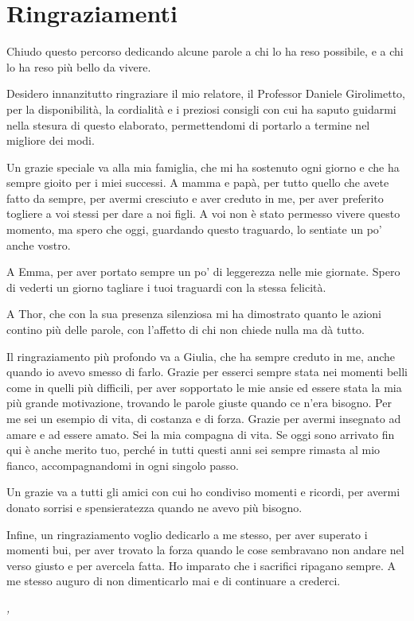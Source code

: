 \clearpage
{}
{}

\pagestyle{empty}

\chapter*{Ringraziamenti}
\thispagestyle{empty}
\begingroup
\setlength{\parskip}{0.6\baselineskip}
\setlength{\parindent}{0pt}

Chiudo questo percorso dedicando alcune parole a chi lo ha reso possibile, e a chi lo ha reso più bello da vivere.

Desidero innanzitutto ringraziare il mio relatore, il Professor Daniele Girolimetto, per la disponibilità, la cordialità e i preziosi 
consigli con cui ha saputo guidarmi nella stesura di questo elaborato, permettendomi di portarlo a termine nel migliore dei modi.

Un grazie speciale va alla mia famiglia, che mi ha sostenuto ogni giorno e che ha sempre gioito per i miei successi. A mamma e papà, per tutto quello che avete fatto da sempre, per avermi cresciuto e aver creduto in me, per aver preferito togliere a voi stessi per dare a noi figli. A voi 
non è stato permesso vivere questo momento, ma spero che oggi, guardando questo traguardo, lo sentiate un po' anche vostro.

A Emma, per aver portato sempre un po' di leggerezza nelle mie giornate. Spero di vederti un giorno tagliare i tuoi traguardi 
con la stessa felicità. 

A Thor, che con la sua presenza silenziosa mi ha dimostrato quanto le azioni contino più delle parole, con l'affetto di chi non chiede nulla ma dà tutto.

Il ringraziamento più profondo va a Giulia, che ha sempre creduto in me, anche quando io avevo smesso di farlo. Grazie per esserci sempre 
stata nei momenti belli come in quelli più difficili, per aver sopportato le mie ansie ed essere stata la mia più grande motivazione, 
trovando le parole giuste quando ce n'era bisogno. Per me sei un esempio di vita, di costanza e di forza. Grazie per avermi insegnato ad 
amare e ad essere amato. Sei la mia compagna di vita. Se oggi sono arrivato fin qui è anche merito tuo, perché in tutti questi anni 
sei sempre rimasta al mio fianco, accompagnandomi in ogni singolo passo.

Un grazie va a tutti gli amici con cui ho condiviso momenti e ricordi, per avermi donato sorrisi e spensieratezza quando ne avevo più bisogno.

Infine, un ringraziamento voglio dedicarlo a me stesso, per aver superato i momenti bui, per aver trovato la 
forza quando le cose sembravano non andare nel verso giusto e per avercela fatta. Ho imparato che i sacrifici ripagano sempre. A me 
stesso auguro di non dimenticarlo mai e di continuare a crederci.

\bigskip



\bigskip
\noindent\textit{\myLocation, \myTime}
\hfill \myName

\cleardoublepage
\pagestyle{fancy}